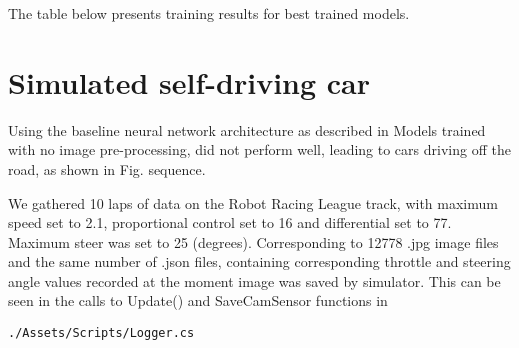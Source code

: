 The table below presents training results for best trained models.

\section{Simulated self-driving car}

Using the baseline neural network architecture as described in 
Models trained with no image pre-processing, did not perform well, leading to cars driving off the road, as shown in Fig.  sequence.

We gathered 10 laps of data on the Robot Racing League track, with maximum speed set to 2.1, proportional control set to 16 and differential set to 77. Maximum steer was set to 25 (degrees). Corresponding to 12778 .jpg image files and the same number of  .json files, containing corresponding throttle and steering angle values recorded at the moment image was saved by simulator. This can be seen in the calls to Update() and SaveCamSensor functions in  
\begin{verbatim}
./Assets/Scripts/Logger.cs
\end{verbatim}

